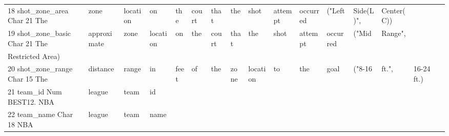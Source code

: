 {\begin{table}[h]
\begin{tabular}{llllllllllllllll}
    18	shot\_zone\_area	Char	21	The & zone & location & on & the & court & that & the & shot & attempt & occurred & ("Left & Side(L)", & Center(C)) &  &  \\
    19	shot\_zone\_basic	Char	21	The & approximate & zone & location & on & the & court & that & the & shot & attempt & occurred & ("Mid & Range", &  &  \\
    Restricted Area) &  &  &  &  &  &  &  &  &  &  &  &  &  &  &  \\
    20	shot\_zone\_range	Char	15	The & distance & range & in & feet & of & the & zone & location & to & the & goal & ("8-16 & ft.", & 16-24 ft.) &  \\
    21	team\_id	Num	BEST12.	NBA & league & team & id &  &  &  &  &  &  &  &  &  &  &  &  \\
    22	team\_name	Char	18	NBA & league & team & name &  &  &  &  &  &  &  &  &  &  &  &
    \end{tabular}
    \end{table}
}
